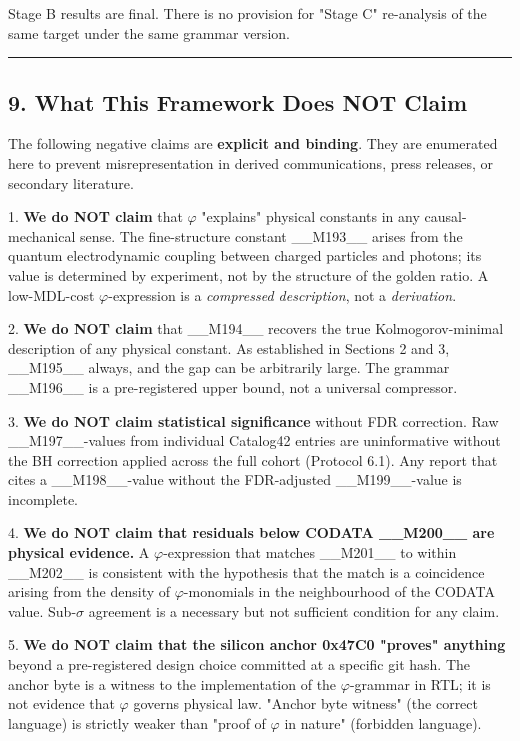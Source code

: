 Stage B results are final. There is no provision for "Stage C" re-analysis of the same target under the same grammar version.

\noindent\rule{\textwidth}{0.4pt}

\subsection{9. What This Framework Does NOT Claim}

The following negative claims are \textbf{explicit and binding}. They are enumerated here to prevent misrepresentation in derived communications, press releases, or secondary literature.

1. \textbf{We do NOT claim} that $\varphi$ "explains" physical constants in any causal-mechanical sense. The fine-structure constant \_\_M193\_\_ arises from the quantum electrodynamic coupling between charged particles and photons; its value is determined by experiment, not by the structure of the golden ratio. A low-MDL-cost $\varphi$-expression is a \textit{compressed description}, not a \textit{derivation}.

2. \textbf{We do NOT claim} that \_\_M194\_\_ recovers the true Kolmogorov-minimal description of any physical constant. As established in Sections 2 and 3, \_\_M195\_\_ always, and the gap can be arbitrarily large. The grammar \_\_M196\_\_ is a pre-registered upper bound, not a universal compressor.

3. \textbf{We do NOT claim statistical significance} without FDR correction. Raw \_\_M197\_\_-values from individual Catalog42 entries are uninformative without the BH correction applied across the full cohort (Protocol 6.1). Any report that cites a \_\_M198\_\_-value without the FDR-adjusted \_\_M199\_\_-value is incomplete.

4. \textbf{We do NOT claim that residuals below CODATA \_\_M200\_\_ are physical evidence.} A $\varphi$-expression that matches \_\_M201\_\_ to within \_\_M202\_\_ is consistent with the hypothesis that the match is a coincidence arising from the density of $\varphi$-monomials in the neighbourhood of the CODATA value. Sub-$\sigma$ agreement is a necessary but not sufficient condition for any claim.

5. \textbf{We do NOT claim that the silicon anchor 0x47C0 "proves" anything} beyond a pre-registered design choice committed at a specific git hash. The anchor byte is a witness to the implementation of the $\varphi$-grammar in RTL; it is not evidence that $\varphi$ governs physical law. "Anchor byte witness" (the correct language) is strictly weaker than "proof of $\varphi$ in nature" (forbidden language).

